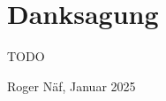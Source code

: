 \thispagestyle{empty}
\section*{Danksagung}
\label{danksagung}
TODO
\begin{flushright}
Roger Näf, Januar 2025
\end{flushright}

